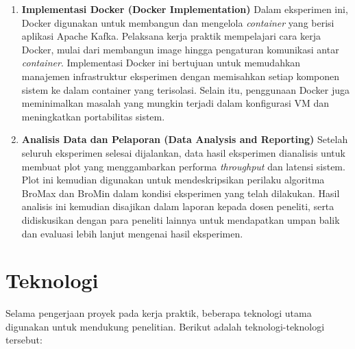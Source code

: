 \begin{enumerate}
	\item \textbf{Implementasi Docker (Docker Implementation)} Dalam eksperimen ini, Docker digunakan untuk membangun dan mengelola \textit{container} yang berisi aplikasi Apache Kafka. Pelaksana kerja praktik mempelajari cara kerja Docker, mulai dari membangun image hingga pengaturan komunikasi antar \textit{container}. Implementasi Docker ini bertujuan untuk memudahkan manajemen infrastruktur eksperimen dengan memisahkan setiap komponen sistem ke dalam container yang terisolasi. Selain itu, penggunaan Docker juga meminimalkan masalah yang mungkin terjadi dalam konfigurasi VM dan meningkatkan portabilitas sistem.

	\item \textbf{Analisis Data dan Pelaporan (Data Analysis and Reporting)} Setelah seluruh eksperimen selesai dijalankan, data hasil eksperimen dianalisis untuk membuat plot yang menggambarkan performa \textit{throughput} dan latensi sistem. Plot ini kemudian digunakan untuk mendeskripsikan perilaku algoritma BroMax dan BroMin dalam kondisi eksperimen yang telah dilakukan. Hasil analisis ini kemudian disajikan dalam laporan kepada dosen peneliti, serta didiskusikan dengan para peneliti lainnya untuk mendapatkan umpan balik dan evaluasi lebih lanjut mengenai hasil eksperimen.

\end{enumerate}

\section{Teknologi}

Selama pengerjaan proyek pada kerja praktik, beberapa teknologi utama digunakan untuk mendukung penelitian. Berikut adalah teknologi-teknologi tersebut:

